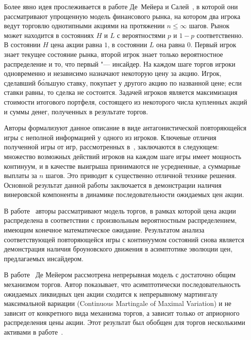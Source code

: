 Более явно идея прослеживается в работе Де~Мейера и Салей~\cite{demeyer02}, в
которой они рассматривают упрощенную модель финансового рынка, на котором два
игрока ведут торговлю однотипными акциями на протяжении $n \leq \infty$ шагов.
Рынок может находится в состояниях $H$ и $L$ с вероятностями $p$ и $1-p$
соответственно. В состоянии $H$ цена акции равна $1$, в состоянии $L$ она равна
$0$. Первый игрок знает текущее состояние рынка, второй игрок знает только
вероятностное распределение и то, что первый "--- инсайдер. На каждом шаге
торгов игроки одновременно и независимо назначают некоторую цену за акцию.
Игрок, сделавший б\'{о}льшую ставку, покупает у другого акцию по названной цене;
если ставки равны, то сделка не состоится. Задачей игроков является максимизация
стоимости итогового портфеля, состоящего из некоторого числа купленных акций и
суммы денег, полученных в результате торгов.

Авторы формализуют данное описание в виде антагонистической повторяющейся игры с
неполной информацией у одного из игроков. Ключевые отличия полученной игры от
игр, рассмотренных в~\cite{aumann95}, заключаются в следующем: множество
возможных действий игроков на каждом шаге игры имеет мощность континуум, и в
качестве выигрыша принимаются не усредненные, а суммарные выплаты за $n$ шагов.
Это приводит к существенно отличной технике решения. Основной результат данной
работы заключается в демонстрации наличия винеровской компоненты в динамике
последовательности ожидаемых цен акции.

В работе~\cite{demeyer02c} авторы рассматривают модель торгов, в рамках которой
цена акции распределена в соответствии с произвольным вероятностным
распределением, имеющим конечное математическое ожидание. Результатом анализа
соответствующей повторяющейся игры с континуумом состояний снова является
демонстрация наличия броуновского движения в асимптотике эволюции цен,
предлагаемых инсайдером.

В работе~\cite{demeyer10} Де Мейером рассмотрена непрерывная модель с достаточно
общим механизмом торгов. Автор показывает, что асимптотически последовательность
ожидаемых ликвидных цен акции сходится к непрерывному мартингалу максимальной
вариации (Continuous Martingale of Maximal Variation) и не зависит от
конкретного вида механизма торгов, а зависит только от априорного распределения
цены акции. Этот результат был обобщен для торгов несколькими активами в
работе~\cite{gensbittel15}.

